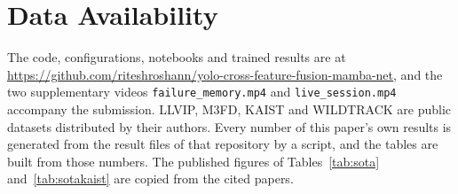 \section*{Data Availability}
The code, configurations, notebooks and trained results are at \url{https://github.com/riteshroshann/yolo-cross-feature-fusion-mamba-net}, and the two supplementary videos \texttt{failure\_memory.mp4} and \texttt{live\_session.mp4} accompany the submission. LLVIP, M3FD, KAIST and WILDTRACK are public datasets distributed by their authors. Every number of this paper's own results is generated from the result files of that repository by a script, and the tables are built from those numbers. The published figures of Tables~\ref{tab:sota} and~\ref{tab:sotakaist} are copied from the cited papers.
